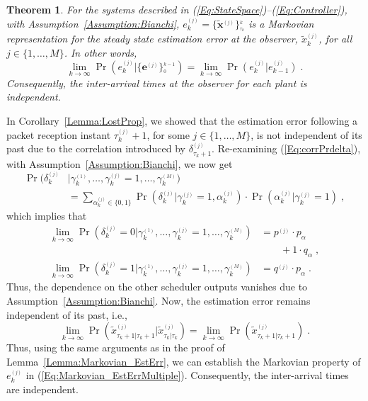 \documentclass[journal]{IEEEtran}
\newcommand{\vect}[1]{\bm{#1}} \newcommand{\D}{\displaystyle}
\newtheorem{theorem}{Theorem}[section]
\begin{document}
\begin{theorem} \label{Theorem:Markovian_EstErr}
For the systems described in (\ref{Eq:StateSpace})--(\ref{Eq:Controller}), with Assumption~\ref{Assumption:Bianchi}, $e^{_{(j)}}_k = \{\vect{\tilde{x}}^{_{(j)}}\}_{^{\tau_k}}^{_{k}}$ is a Markovian representation for the steady state estimation error at the observer, $\tilde{x}^{_{(j)}}_{k}$, for all $j \in \{1,\dots,M\}$. In other words,
\begin{equation} \label{Eq:Markovian_EstErrMultiple}
\lim_{k \to \infty} \Pr(e^{_{(j)}}_k|\{\vect{e}^{_{(j)}}\}_{^{0}}^{_{k-1}}) = \lim_{k \to \infty} \Pr(e^{_{(j)}}_k|e^{_{(j)}}_{k-1}) \; .
\end{equation}
Consequently, the inter-arrival times at the observer for each plant is independent.
\end{theorem}
\begin{IEEEproof}
In Corollary~\ref{Lemma:LostProp}, we showed that the estimation error following a packet reception instant $\tau^{_{(j)}}_{k}+1$, for some $j \in \{1,\dots,M\}$, is not independent of its past due to the correlation introduced by $\delta^{_{(j)}}_{\tau_{k}+1}$. Re-examining (\ref{Eq:corrPrdelta}), with Assumption~\ref{Assumption:Bianchi}, we now get
\begin{align*}
\Pr(\delta^{_{(j)}}_k &| \gamma^{_{(1)}}_{k},\dots,\gamma^{_{(j)}}_{k}=1,\dots,\gamma^{_{(M)}}_{k}) \\ 
&= \sum_{\alpha^{_{(j)}}_k \in \{0,1\}} \Pr(\delta^{_{(j)}}_k | \gamma^{_{(j)}}_{k}=1, \alpha^{_{(j)}}_k) \cdot \Pr(\alpha^{_{(j)}}_k | \gamma^{_{(j)}}_k=1) \; ,
\end{align*}
which implies that
\begin{align*}
\lim_{k \to \infty} \Pr(\delta^{_{(j)}}_k = 0 | \gamma^{_{(1)}}_{k},\dots,\gamma^{_{(j)}}_{k}=1,\dots,\gamma^{_{(M)}}_{k}) &= p^{_{(j)}} \cdot p_{\alpha} \\
& \quad \quad + 1 \cdot q_{\alpha} \; , \\
\lim_{k \to \infty} \Pr(\delta^{_{(j)}}_k = 1 | \gamma^{_{(1)}}_{k},\dots,\gamma^{_{(j)}}_{k}=1,\dots,\gamma^{_{(M)}}_{k}) &= q^{_{(j)}} \cdot p_{\alpha} \; .
\end{align*}
Thus, the dependence on the other scheduler outputs vanishes due to Assumption~\ref{Assumption:Bianchi}. Now, the estimation error remains independent of its past, i.e.,
\begin{equation*}
\lim_{k \to \infty} \Pr(\tilde{x}^{_{(j)}}_{\tau_k+1|\tau_k+1} | \tilde{x}^{_{(j)}}_{\tau_k|\tau_k}) = \lim_{k \to \infty} \Pr(\tilde{x}^{_{(j)}}_{\tau_k+1|\tau_k+1}) \; .
\end{equation*}
Thus, using the same arguments as in the proof of Lemma~\ref{Lemma:Markovian_EstErr}, we can establish the Markovian property of $e^{_{(j)}}_k$ in (\ref{Eq:Markovian_EstErrMultiple}). Consequently, the inter-arrival times are independent.
\end{IEEEproof}
\end{document}
